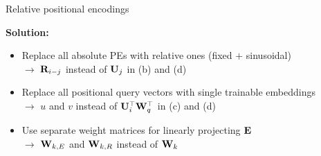 \begin{vbframe}{Relative positional encodings}

\vfill

\textbf{Solution:}

\begin{itemize}
	\item Replace all absolute PEs with relative ones (fixed $+$ sinusoidal)\\
				$\to$ ${\mathbf{R}}_{i-j}$ instead of ${\mathbf{U}}_{j}$ in (b) and (d)
	\item Replace all positional query vectors with single trainable embeddings\\
				$\to$ $u$ and $v$ instead of ${\mathbf{U}}_{i}^\top {\mathbf{W}}_q^\top$ in (c) and (d)
	\item Use separate weight matrices for linearly projecting ${\mathbf{E}}$\\
				$\to$ ${\mathbf{W}}_{k,E}$ and ${\mathbf{W}}_{k,R}$ instead of ${\mathbf{W}}_{k}$
\end{itemize}

\vfill

\end{vbframe}


\endlecture

